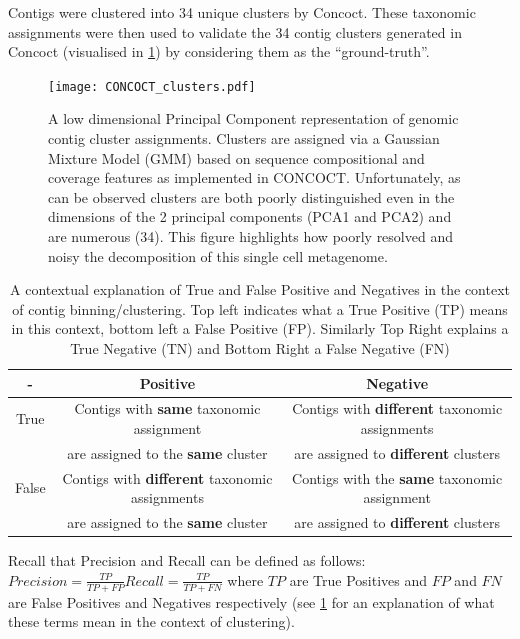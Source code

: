 Contigs were clustered into 34 unique clusters by Concoct.
These taxonomic assignments were then used to validate the 34 contig clusters 
generated in Concoct (visualised in \cref{fig:concoct_clusters}) by considering them
as the ``ground-truth''.

\begin{figure}
	\texttt{[image: CONCOCT\_clusters.pdf]}
    \caption[Genomic Contig Clustering]{A low dimensional Principal Component representation of genomic contig
		cluster assignments.  Clusters are assigned via a Gaussian Mixture Model (GMM) 
		based on sequence compositional and coverage features as implemented in CONCOCT.
		Unfortunately, as can be observed clusters are both poorly distinguished even
		in the dimensions of the 2 principal components (PCA1 and PCA2) and are numerous (34).
    This figure highlights how poorly resolved and noisy the decomposition of this single cell
    metagenome.}
	\label{fig:concoct_clusters}
\end{figure}

\begin{table}
    \begin{tabular}{| c || c | c |}
    	\hline
		 - & Positive & Negative \\
		 \hline
		 \hline
		True  &  Contigs with \textbf{same} taxonomic assignment   & Contigs with \textbf{different} taxonomic assignments \\
		& are assigned to the \textbf{same} cluster & are assigned to \textbf{different} clusters \\
		\hline
		False &  Contigs with \textbf{different} taxonomic assignments  & Contigs with the \textbf{same} taxonomic assignment \\
		& are assigned to the \textbf{same} cluster & are assigned to \textbf{different} clusters  \\
		\hline
	\end{tabular}
    \caption[Explanation of Clustering Errors]{A contextual explanation of True and False Positive and Negatives in the context of contig binning/clustering.  Top left indicates what a
		True Positive (TP) means in this context, bottom left a False Positive (FP).  Similarly Top Right explains a True Negative (TN) and Bottom Right a
		False Negative (FN)}
	\label{tab:cluster_outcome_explanation}
\end{table}

Recall that Precision and Recall can be defined as follows:
\( Precision = \frac{TP}{TP+FP} Recall = \frac{TP}{TP+FN} \)
where \(TP\) are True Positives and \(FP\) and \(FN\) are False Positives
and Negatives respectively (see \cref{tab:cluster_outcome_explanation} for an 
explanation of what these terms mean in the context of clustering).

